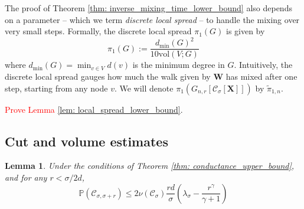 \documentclass{article}
\newcommand{\vol}{\mathrm{vol}}
\newcommand{\1}{\mathbf{1}}
\newcommand{\Xbf}{\mathbf{X}}
\newcommand{\Wbf}{\mathbf{W}}
\newcommand{\Pbb}{\mathbb{P}}
\newcommand{\Cset}{\mathcal{C}}
\newcommand{\Csig}{\Cset_{\sigma}}
\newcommand{\Csigr}{\Cset_{\sigma,\sigma + r}}
\theoremstyle{aldenthm}
\newtheorem{lemma}{Lemma}
\begin{document}
The proof of Theorem \ref{thm: inverse_mixing_time_lower_bound} also depends on a parameter -- which we term \emph{discrete local spread} -- to handle the mixing over very small steps. Formally, the discrete local spread $\pi_1(G)$ is given by
\begin{equation}
\label{eqn: local_spread}
\pi_1(G) := \frac{d_{\min}(G)^2}{10 \vol(V; G)} 
\end{equation}
where $d_{\min}(G) = \min_{v \in V} d(v)$ is the minimum degree in $G$. Intuitively, the discrete local spread gauges how much the walk given by $\Wbf$ has mixed after one step, starting from any node $v$. We will denote $\pi_1(G_{n,r}[\Csig[\Xbf]])$ by $\widetilde{\pi}_{1,n}$. 

\textcolor{red}{Prove Lemma \ref{lem: local_spread_lower_bound}}.

\subsection{Cut and volume estimates}
\begin{lemma}
	\label{lem: expected_number_boundary_points}
	Under the conditions of Theorem \ref{thm: conductance_upper_bound}, and for any $r < \sigma/2d$,
	\begin{equation*}
	\Pbb(\Csigr) \leq 2 \nu(\Csig) \frac{rd}{\sigma}  \left(\lambda_{\sigma} - \frac{r^{\gamma}}{\gamma + 1}\right)
	\end{equation*}	
\end{lemma}
\end{document}
